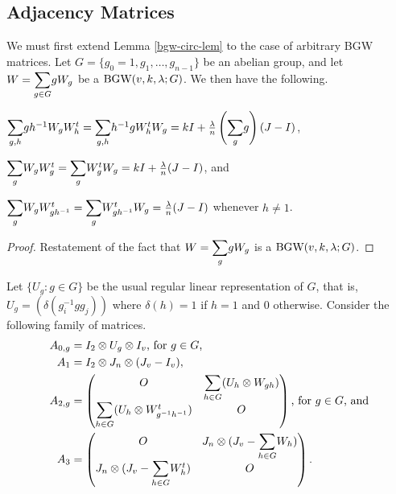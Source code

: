 \documentclass[../../../main]{subfiles}
\begin{document}
\subsection{Adjacency Matrices}

We must first extend Lemma \ref{bgw-circ-lem} to the case of arbitrary BGW matrices. Let $G=\{g_0=1,g_1,\dots,g_{n-1}\}$ be an abelian group, and let $W=\ssum_{g \in G}g W_g$ be a $\text{BGW}(v,k,\lambda; G)$. We then have the following.

\begin{lem}
 \begin{defenum}
  \item[]
  \item $\ssum_{g,h}gh^{-1}W_gW_h^t = \ssum_{g,h}h^{-1}gW_h^tW_g = kI + \frac{\lambda}{n}\left(\ssum_gg\right)(J-I)$,
  \item $\ssum_gW_gW_g^t = \ssum_gW_g^tW_g = kI + \frac{\lambda}{n}(J-I)$, and
  \item $\ssum_gW_gW_{gh^{-1}}^t = \ssum_gW_{gh^{-1}}^tW_g = \frac{\lambda}{n}(J-I)$ whenever $h \neq 1$.
 \end{defenum}
\end{lem}

\begin{proof}
 Restatement of the fact that $W = \ssum_ggW_g$ is a $\text{BGW}(v,k,\lambda;G)$.
\end{proof}

Let $\{U_g : g \in G\}$ be the usual regular linear representation of $G$, that is, $U_g = (\delta(g_i^{-1}gg_j))$ where $\delta(h) = 1$ if $h=1$ and $0$ otherwise. Consider the following family of matrices.
\begin{align*}
 A_{0,g} &= I_2 \otimes U_g \otimes I_v \text{, for $g \in G$,} \\
 A_1 &= I_2 \otimes J_n \otimes (J_v-I_v), \\
 A_{2,g} &= \begin{pmatrix} O & \ssum_{h \in G} (U_h \otimes W_{gh}) \\ \ssum_{h \in G} (U_h \otimes W_{g^{-1}h^{-1}}^t) & O \end{pmatrix} \text{, for $g \in G$, and} \\
 A_3 &= \begin{pmatrix} O & J_n \otimes (J_v - \ssum_{h \in G} W_h) \\ J_n \otimes (J_v - \ssum_{h \in G} W_h^t) & O \end{pmatrix}.
\end{align*}
\end{document}
